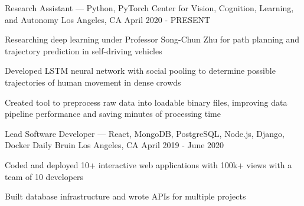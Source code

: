 \documentclass[12pt, letterpaper]{awesome-cv}
\begin{document}
\begin{cventries}
  \cventry
    {Research Assistant — Python, PyTorch} %
    {Center for Vision, Cognition, Learning, and Autonomy} %
    {Los Angeles, CA} %
    {April 2020 - PRESENT} %
    {
      \begin{cvitems} %
        \item {Researching deep learning under Professor Song-Chun Zhu for path planning and trajectory prediction in self-driving vehicles}
        \item {Developed LSTM neural network with social pooling to determine possible trajectories of human movement in dense crowds}
        \item {Created tool to preprocess raw data into loadable binary files, improving data pipeline performance and saving minutes of processing time}
      \end{cvitems}
    }


  \cventry
    {Lead Sof\/tware Developer — React, MongoDB, PostgreSQL, Node.js, Django, Docker} %
    {Daily Bruin} %
    {Los Angeles, CA} %
    {April 2019 - June 2020} %
    {
      \begin{cvitems} %
        \item {Coded and deployed 10+ interactive web applications with 100k+ views with a team of 10 developers}
        \item {Built database infrastructure and wrote APIs for multiple projects}
      \end{cvitems}
    }

\end{cventries}
\end{document}
